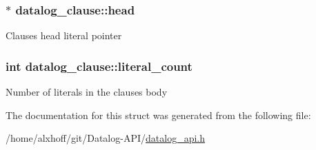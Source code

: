 \subsubsection[{\texorpdfstring{head}{head}}]{$\ast$ datalog\+\_\+clause\+::head}\hypertarget{structdatalog__clause_a76efe58a26d93f778904a8ab8f7e12d6}{}\label{structdatalog__clause_a76efe58a26d93f778904a8ab8f7e12d6}
Clause\textquotesingle{}s head literal pointer 
\subsubsection[{\texorpdfstring{literal\+\_\+count}{literal_count}}]{\setlength{\rightskip}{0pt plus 5cm}int datalog\+\_\+clause\+::literal\+\_\+count}\hypertarget{structdatalog__clause_abcd26a3624b9be0f775ca0828bb2deb9}{}\label{structdatalog__clause_abcd26a3624b9be0f775ca0828bb2deb9}
Number of literals in the clause\textquotesingle{}s body 

The documentation for this struct was generated from the following file\+:\begin{DoxyCompactItemize}
\item 
/home/alxhoff/git/\+Datalog-\/\+A\+P\+I/\hyperlink{datalog__api_8h}{datalog\+\_\+api.\+h}\end{DoxyCompactItemize}
